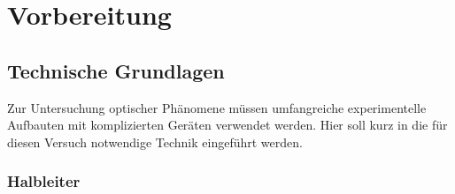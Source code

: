 \chapter{Vorbereitung}

\section{Technische Grundlagen}

Zur Untersuchung optischer Phänomene müssen umfangreiche experimentelle Aufbauten
mit komplizierten Geräten verwendet werden. Hier soll kurz in die für diesen
Versuch notwendige Technik eingeführt werden.


    \subsection{Halbleiter}

